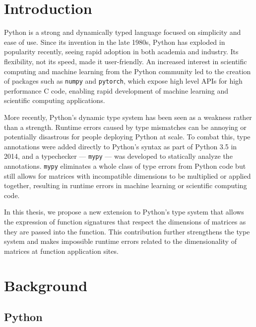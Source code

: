 \documentclass{article}
\begin{document}
\tableofcontents
\newpage

\begin{abstract}
\end{abstract}

\section{Introduction}

Python is a strong and dynamically typed language focused on simplicity and ease of use. Since its invention in the late 1980s, Python has exploded in popularity recently, seeing rapid adoption in both academia and industry. Its flexibility, not its speed, made it user-friendly. An increased interest in scientific computing and machine learning from the Python community led to the creation of packages such as \texttt{numpy} and \texttt{pytorch}, which expose high level APIs for high performance C code, enabling rapid development of machine learning and scientific computing applications.

More recently, Python's dynamic type system has been seen as a weakness rather than a strength. Runtime errors caused by type mismatches can be annoying or potentially disastrous for people deploying Python at scale. To combat this, type annotations were added directly to Python's syntax as part of Python 3.5 in 2014, and a typechecker --- \texttt{mypy} --- was developed to statically analyze the annotations. \texttt{mypy} eliminates a whole class of type errors from Python code but still allows for matrices with incompatible dimensions to be multiplied or applied together, resulting in runtime errors in machine learning or scientific computing code.

In this thesis, we propose a new extension to Python's type system that allows the expression of function signatures that respect the dimensions of matrices as they are passed into the function. This contribution further strengthens the type system and makes impossible runtime errors related to the dimensionality of matrices at function application sites.

\newpage

\section{Background}

\subsection{Python}
\end{document}
